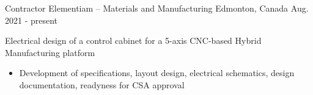 

\begin{cventries}


  \cventry
    {Contractor} %
    {Elementiam -- Materials and Manufacturing} %
    {Edmonton, Canada} %
    {Aug. 2021 - present} %
    {
      \begin{cvitems}
        \item Electrical design of a control cabinet for a 5-axis CNC-based Hybrid Manufacturing platform
        \begin{itemize}
          \item Development of specifications, layout design, electrical schematics, design documentation, readyness for CSA approval
        \end{itemize}
      \end{cvitems}
    }


\end{cventries}
